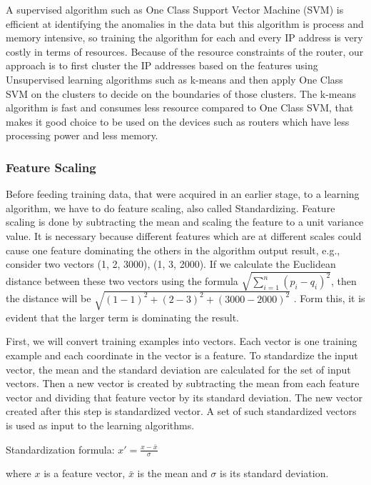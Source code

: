 \documentclass[12pt,oneside,a4paper]{article}
\begin{document}
A supervised algorithm such as One Class Support Vector Machine (SVM)\cite{svm} is efficient at identifying the anomalies in the data but this algorithm is process and memory intensive, so training the algorithm for each and every IP address is very costly in terms of resources. Because of the resource constraints of the router, our approach is to first cluster the IP addresses based on the features using Unsupervised learning algorithms such as k-means and then apply One Class SVM on the clusters to decide on the boundaries of those clusters. The k-means algorithm is fast and consumes less resource compared to One Class SVM, that makes it good choice to be used on the devices such as routers which have less processing power and less memory.

\subsubsection{Feature Scaling}

Before feeding training data, that were acquired in an earlier stage, to a learning algorithm, we have to do feature scaling, also called Standardizing. Feature scaling is done by subtracting the mean and scaling the feature to a unit variance value. It is necessary because  different features which are at different scales could cause one feature dominating the others in the algorithm output result, e.g., consider two vectors (1, 2, 3000), (1, 3, 2000). If we calculate the Euclidean distance between these two vectors using the formula $\sqrt{\sum_{i=1}^n (p_i - q_i)^2}$, then the distance will be $\sqrt{(1-1)^2 + (2-3)^2 + (3000-2000)^2}$ . Form this, it is evident that the larger term is dominating the result.

First, we will convert training examples into vectors. Each vector is one training example and each coordinate in the vector is a feature. To standardize the input vector, the mean and the standard deviation are calculated for the set of input vectors. Then a new vector is created by subtracting the mean from each feature vector and dividing that feature vector by its standard deviation. The new vector created after this step is standardized vector. A set of such standardized vectors is used as input to the learning algorithms.

\hspace{2cm} Standardization formula: $x' = \frac{x - \bar{x}}{\sigma}$

where $x$ is a feature vector, ${\bar{x}}$ is the mean and $\sigma$  is its standard deviation.
\end{document}
